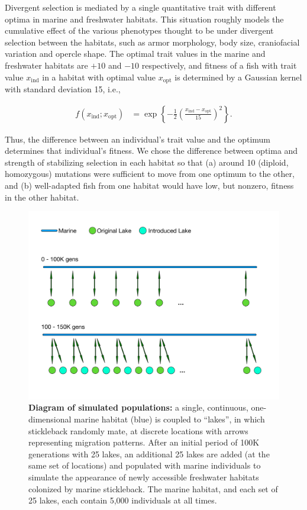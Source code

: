\documentclass{article}
\begin{document}
Divergent selection is mediated by a single quantitative trait with different optima in marine and freshwater habitats. 
This situation roughly models the cumulative effect of the various phenotypes thought to be under divergent selection between the habitats, such as armor morphology, body size, craniofacial variation and opercle shape.
The optimal trait values in the marine and freshwater habitats are $+10$ and $-10$ respectively, and fitness of a fish with trait value $x_\text{ind}$ in a habitat with optimal value $x_\text{opt}$ is determined by a Gaussian kernel with standard deviation 15, i.e.,

\begin{align*}
    f(x_\text{ind}; x_\text{opt})
    &=
    \exp\left\{
        - \frac{1}{2}
            \left(
            \frac{x_\text{ind}-x_\text{opt}}{15}
            \right)^2
        \right\} .
\end{align*}

Thus, the difference between an individual's trait value and the optimum determines that individual's fitness. 
We chose the difference between optima and strength of stabilizing selection in each habitat so that (a) around 10 (diploid, homozygous) mutations were sufficient to move from one optimum to the other, and (b) well-adapted fish from one habitat would have low, but nonzero, fitness in the other habitat.

\begin{figure}
    \begin{center}
          \includegraphics[width=0.8\linewidth]{Final_Plots/GeographyFigure.pdf}
          \caption{
            \textbf{Diagram of simulated populations:}
            a single, continuous, one-dimensional marine habitat (blue)
            is coupled to ``lakes'', in which stickleback randomly mate, at discrete locations with arrows representing migration patterns.
            After an initial period of 100K generations with 25 lakes,
            an additional 25 lakes are added (at the same set of locations) and populated with marine individuals
            to simulate the appearance of newly accessible freshwater habitats colonized by marine stickleback.
            The marine habitat, and each set of 25 lakes, each contain 5,000 individuals at all times.
            }
          \label{fig:Geo}
    \end{center}
\end{figure}
\end{document}
